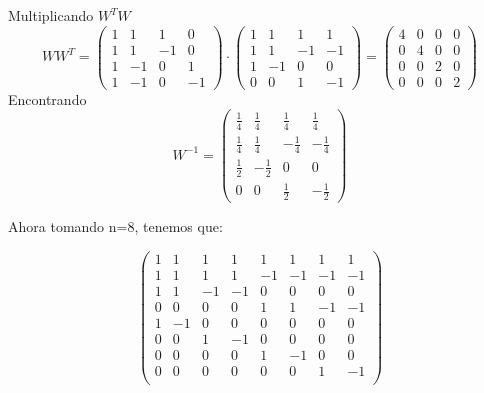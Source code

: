 \documentclass{report}
\begin{document}
\begin{enumerate}
    
    Multiplicando $W^TW$
    $$WW^T=\begin{pmatrix}
        1 &1&1&0\\
        1 & 1 &-1 &0\\
        1 & -1 &0 &1\\
        1 & -1 &0 &-1
    \end{pmatrix}\cdot\begin{pmatrix}
        1 & 1 & 1 & 1 \\
        1 & 1 & -1 & -1 \\
        1 & -1 & 0 & 0 \\
        0 & 0 & 1 & -1
    \end{pmatrix}=\begin{pmatrix}
        4 & 0 & 0 & 0 \\
        0 & 4 & 0 & 0 \\
        0 & 0 & 2 & 0 \\
        0 & 0 & 0 & 2
    \end{pmatrix}$$
    Encontrando $$W^{-1}=\begin{pmatrix}
        \frac{1}{4}&\frac{1}{4}&\frac{1}{4}&\frac{1}{4}\\
        \frac{1}{4}&\frac{1}{4}&-\frac{1}{4}&-\frac{1}{4}\\
        \frac{1}{2}&-\frac{1}{2}&0&0\\
        0&0&\frac{1}{2}&-\frac{1}{2}
    \end{pmatrix}$$
    
    Ahora tomando n=8, tenemos que:
    
    $$
    \begin{pmatrix}
       1 & 1 & 1 & 1 & 1 & 1 & 1 & 1 \\
       1 & 1 & 1 & 1 & -1 & -1 & -1 & -1 \\
       1 & 1 & -1 & -1 & 0 & 0 & 0 & 0 \\
       0 & 0 & 0 & 0 & 1 & 1 & -1 & -1 \\
       1 & -1 & 0 & 0 & 0 & 0 & 0 & 0 \\
       0 & 0 & 1 & -1 & 0 & 0 & 0 & 0 \\
       0 & 0 & 0 & 0 & 1 & -1 & 0 & 0 \\
       0 & 0 & 0 & 0 & 0 & 0 & 1 & -1 \\
    \end{pmatrix}
    $$
    
    \begin{figure}[h]
    \centering
    
    
    
    \end{figure}
    
    
    \end{enumerate}
    
    
\end{document}

